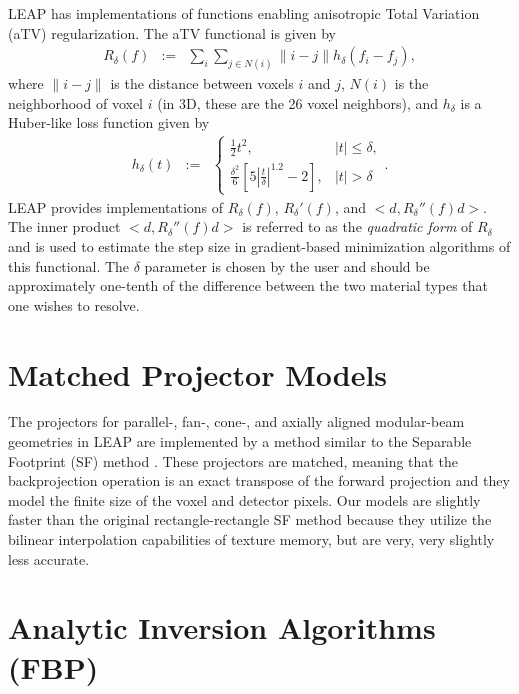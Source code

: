 \documentclass[11pt]{article}
\begin{document}
LEAP has implementations of functions enabling anisotropic Total Variation (aTV) regularization.  The aTV functional is given by
\begin{eqnarray*}
R_\delta(f) &:=& \sum_i \sum_{j \in N(i)} \|i-j\| h_\delta(f_i-f_j),
\end{eqnarray*}
where $\|i-j\|$ is the distance between voxels $i$ and $j$, $N(i)$ is the neighborhood of voxel $i$ (in 3D, these are the 26 voxel neighbors), and $h_\delta$ is a Huber-like loss function given by
\begin{eqnarray*}
h_\delta(t) &:=& \begin{cases} \frac{1}{2}t^2, & |t| \leq \delta, \\ \frac{\delta^2}{6}\left[5\left|\frac{t}{\delta}\right|^{1.2}-2\right], & |t| > \delta \end{cases}.
\end{eqnarray*}
LEAP provides implementations of $R_\delta(f)$, $R_{\delta}'(f)$, and $<d, R_{\delta}''(f)d>$.  The inner product $<d, R_{\delta}''(f)d>$ is referred to as the \textit{quadratic form} of $R_\delta$ and is used to estimate the step size in gradient-based minimization algorithms of this functional.  The $\delta$ parameter is chosen by the user and should be approximately one-tenth of the difference between the two material types that one wishes to resolve.

\section{Matched Projector Models}

The projectors for parallel-, fan-, cone-, and axially aligned modular-beam geometries in LEAP are implemented by a method similar to the Separable Footprint (SF) method \cite{Long_TMI_2010}.  These projectors are matched, meaning that the backprojection operation is an exact transpose of the forward projection and they model the finite size of the voxel and detector pixels.  Our models are slightly faster than the original rectangle-rectangle SF method because they utilize the bilinear interpolation capabilities of texture memory, but are very, very slightly less accurate.

\section{Analytic Inversion Algorithms (FBP)} \label{sec:FBP}
\end{document}
